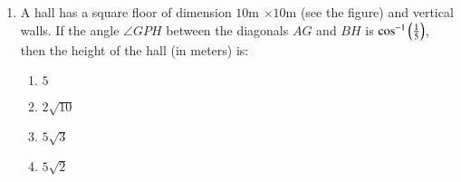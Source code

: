 \documentclass[journal,9pt,onecolumn]{IEEEtran}
\begin{document}
\begin{enumerate}
\item A hall has a square floor of dimension $10$m $\times 10$m (see the figure) and vertical walls. If the angle $\angle GPH$ between the diagonals $AG$ and $BH$ is $\cos^{-1} \left( \frac{1}{5}\right)$, then the height of the hall (in meters) is:

\begin{center}

\end{center}    
\begin{multicols}{4}
\begin{enumerate}
    \item $5$
    \item $2\sqrt{10}$
    \item $5\sqrt{3}$
    \item $5\sqrt{2}$
\end{enumerate}
\end{multicols}


\end{enumerate}
\end{document}
